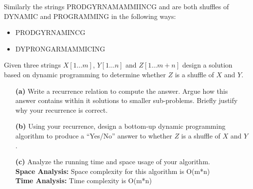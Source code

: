 \documentclass[11pt]{article}
\theoremstyle{definition}
\theoremstyle{theorem}
\begin{document}
Similarly the strings {\color{red}PRODGYRNAMAMMIINCG} and {\color{red}{DYPRONGARMAMMICING} are both shuffles of {\color{blue}DYNAMIC}} and {\color{red}PROGRAMMING} in the following ways:

\begin{itemize}
    \item{{\color{red}PRO}{\color{blue}D}{\color{red}G}{\color{blue}Y}{\color{red}R}{\color{blue}NAM}{\color{red}{AMMI}}{\color{blue}I}{\color{red}N}{\color{blue}C}{\color{red}G}}
    \item{{\color{blue}DY}{\color{red}PRO}{\color{blue}N}{\color{red}G}{\color{blue}A}{\color{red}R}{\color{blue}M}{\color{red}AMM}{\color{blue}IC}{\color{red}ING}}
    \end{itemize}
    
Given three strings $X[1\ldots m]$, $Y[1\ldots n]$ and $Z[1\ldots m+n]$ design a solution based on dynamic programming to determine whether $Z$ is a shuffle of $X$ and $Y$.

\begin{itemize}
\item[{\bf (a)}] Write a recurrence relation to compute the answer. Argue how this answer contains within it solutions to smaller sub-problems. Briefly justify why your recurrence is correct.

\item[{\bf (b)}] Using your recurrence, design a bottom-up dynamic programming
  algorithm to produce a ``Yes/No'' answer to whether $Z$ is a shuffle of $X$ and $Y$. \\
  
\begin{algorithm}[H]
\end{algorithm}
  
\item[{\bf (c)}]
  Analyze the running time and space usage of your algorithm.\\
\textbf{Space Analysis:} Space complexity for this algorithm is O(m*n) \\
\textbf{Time Analysis:} Time complexity is O(m*n) \\

\end{itemize}
\end{document}
